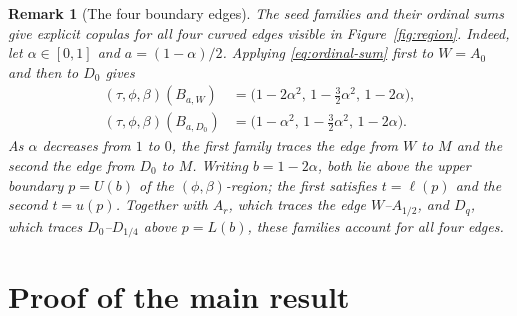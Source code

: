 \documentclass{article}
\newtheorem{remark}[theorem]{Remark}
\begin{document}
\begin{remark}[The four boundary edges]\label{rem:boundary-edges}
The seed families and their ordinal sums give explicit copulas for all four curved edges visible in Figure~\ref{fig:region}.
Indeed, let $\alpha\in[0,1]$ and $a=(1-\alpha)/2$.
Applying \eqref{eq:ordinal-sum} first to $W=A_0$ and then to $D_0$ gives
\begin{align*}
(\tau,\phi,\beta)(B_{a,W})
&=\bigl(1-2\alpha^2,\,1-\tfrac32\alpha^2,\,1-2\alpha\bigr),\\
(\tau,\phi,\beta)(B_{a,D_0})
&=\bigl(1-\alpha^2,\,1-\tfrac32\alpha^2,\,1-2\alpha\bigr).
\end{align*}
As $\alpha$ decreases from $1$ to $0$, the first family traces the edge from $W$ to $M$ and the second the edge from $D_0$ to $M$. %
Writing $b=1-2\alpha$, both lie above the upper boundary $p=U(b)$ of the $(\phi,\beta)$-region; the first satisfies $t=\ell(p)$ and the second $t=u(p)$.
Together with $A_r$, which traces the edge $W$--$A_{1/2}$, and $D_q$, which traces $D_0$--$D_{1/4}$ above $p=L(b)$, these families account for all four edges.
\end{remark}


\section{Proof of the main result}\label{sec:proof}
\end{document}
